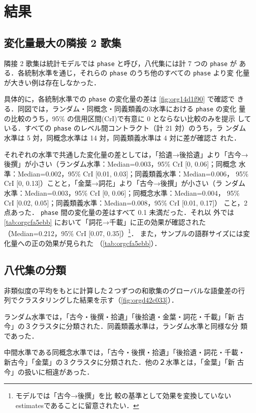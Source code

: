 \documentclass[submit]{ipsj}
\renewcommand{\ref}{\cref}
\begin{document}
\section{結果\label{orgdebc25a}}
\label{sec:orgbcb3f14}
\subsection{変化量最大の隣接 2 歌集\label{orge02a181}}
\label{sec:orgff0d399}
隣接 2 歌集は統計モデルでは \texttt{phase} と呼び，八代集には計 7 つの \texttt{phase} が
ある．各統制水準を通じ，それらの \texttt{phase} のうち他のすべての \texttt{phase} より変
化量が大きい例は存在しなかった．

具体的に，各統制水準での \texttt{phase} の変化量の差は \ref{fig:org14d1f90} で確認で
きる．同図では，ランダム・同概念・同義類義の3水準における \texttt{phase} の変化
量の比較のうち，95\% の信用区間(CrI)で有意に 0 とならない比較のみを提示
している．すべての \texttt{phase} のレベル間コントラクト（計 21 対）のうち，ラ
ンダム水準は 5 対，同概念水準は 14 対，同義類義水準は 4 対に差が確認さ
れた．

それぞれの水準で共通した変化量の差としては，「拾遺→後拾遺」より「古今→
後撰」が小さい（ランダム水準：Median=0.003，95\% CrI [0, 0.06]；同概念
水準：Median=0.002，95\% CrI [0.01, 0.03]；同義類義水準：Median=0.006，
95\% CrI [0, 0.13]）ことと，「金葉→詞花」より「古今→後撰」が小さい（ラ
ンダム水準：Median=0.003，95\% CrI [0, 0.06]；同概念水準：Median=0.004，
95\% CrI [0.02, 0.05]；同義類義水準：Median=0.008，95\% CrI [0.01, 0.17]）
こと，2点あった． \texttt{phase} 間の変化量の差はすべて 0.1 未満だった．それ以
外では\ref{tab:orgcfa5ebb} において「詞花→千載」に正の効果が確認された
（Median=0.212，95\% CrI [0.07, 0.35]）\footnote{モデルでは「古今→後撰」を比
較の基準として効果を変換していないestimatesであることに留意されたい．}．
また，サンプルの語群サイズには変化量への正の効果が見られた
（\ref{tab:orgcfa5ebb}）．
\subsection{八代集の分類\label{org3ff9a9a}}
\label{sec:org2690cbe}
非類似度の平均をもとに計算した２つずつの和歌集のグローバルな語彙差の行
列でクラスタリングした結果を示す（\ref{fig:orgd42c033}）．

ランダム水準では，「古今・後撰・拾遺」「後拾遺・金葉・詞花・千載」「新
古今」の３クラスタに分類された．同義類義水準は，ランダム水準と同様な分
類であった．

中間水準である同概念水準では，「古今・後撰・拾遺」「後拾遺・詞花・千載・
新古今」「金葉」の３クラスタに分類された．他の２水準とは，「金葉」「新
古今」の扱いに相違があった．
\end{document}
